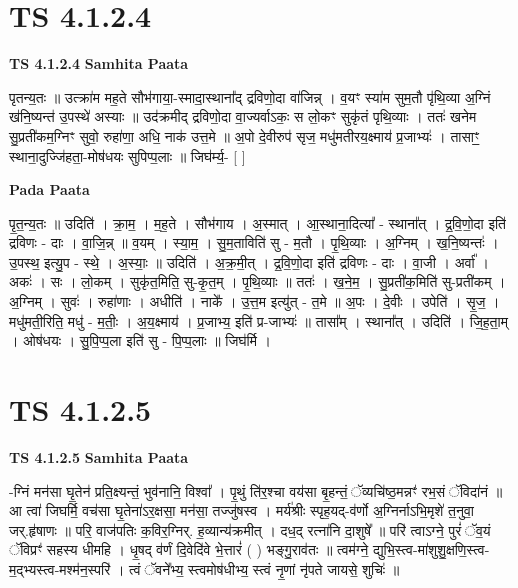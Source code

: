 \documentclass[17pt]{extarticle}
\begin{document}

\section{ TS 4.1.2.4 }

\textbf{TS 4.1.2.4 } \newline
\textbf{Samhita Paata} \newline

पृतन्य॒तः ॥ उत्क्रा॑म मह॒ते सौभ॑गाया॒-स्मादा॒स्थाना᳚द् द्रविणो॒दा वा॑जिन्न् । व॒यꣳ स्या॑म सुम॒तौ पृ॑थि॒व्या अ॒ग्निं ख॑नि॒ष्यन्त॑ उ॒पस्थे॑ अस्याः ॥ उद॑क्रमीद् द्रविणो॒दा वा॒ज्यर्वाऽकः॒ स लो॒कꣳ सुकृ॑तं पृथि॒व्याः । ततः॑ खनेम सु॒प्रती॑कम॒ग्निꣳ सुवो॒ रुहा॑णा॒ अधि॒ नाक॑ उत्त॒मे ॥ अ॒पो दे॒वीरुप॑ सृज॒ मधु॑मतीरय॒क्ष्माय॑ प्र॒जाभ्यः॑ । तासाꣳ॒॒ स्थाना॒दुज्जि॑हता॒-मोष॑धयः सुपिप्प॒लाः ॥ जिघ॑र्म्य॒- [  ] \newline

\textbf{Pada Paata} \newline

पृ॒त॒न्य॒तः ॥ उदिति॑ । क्रा॒म॒ । म॒ह॒ते । सौभ॑गाय । अ॒स्मात् । आ॒स्थाना॒दित्या᳚ - स्थाना᳚त् । द्र॒वि॒णो॒दा इति॑ द्रविणः - दाः । वा॒जि॒न्न् ॥ व॒यम् । स्या॒म॒ । सु॒म॒ताविति॑ सु - म॒तौ । पृ॒थि॒व्याः । अ॒ग्निम् । ख॒नि॒ष्यन्तः॑ । उ॒पस्थ॒ इत्यु॒प - स्थे॒ । अ॒स्याः॒ ॥ उदिति॑ । अ॒क्र॒मी॒त् । द्र॒वि॒णो॒दा इति॑ द्रविणः - दाः । वा॒जी । अर्वा᳚ । अकः॑ । सः । लो॒कम् । सुकृ॑त॒मिति॒ सु-कृ॒त॒म् । पृ॒थि॒व्याः ॥ ततः॑ । ख॒ने॒म॒ । सु॒प्रती॑क॒मिति॑ सु-प्रती॑कम् । अ॒ग्निम् । सुवः॑ । रुहा॑णाः । अधीति॑ । नाके᳚ । उ॒त्त॒म इत्यु॑त् - त॒मे ॥ अ॒पः । दे॒वीः । उपेति॑ । सृ॒ज॒ । मधु॑मती॒रिति॒ मधु॑ - म॒तीः॒ । अ॒य॒क्ष्माय॑ । प्र॒जाभ्य॒ इति॑ प्र-जाभ्यः॑ ॥ तासा᳚म् । स्थाना᳚त् । उदिति॑ । जि॒ह॒ता॒म् । ओष॑धयः । सु॒पि॒प्प॒ला इति॑ सु - पि॒प्प॒लाः ॥ जिघ॑र्मि ।  \newline





\section{ TS 4.1.2.5 }

\textbf{TS 4.1.2.5 } \newline
\textbf{Samhita Paata} \newline

-ग्निं मन॑सा घृ॒तेन॑ प्रति॒क्ष्यन्तं॒ भुव॑नानि॒ विश्वा᳚ । पृ॒थुं ति॑र॒श्चा वय॑सा बृ॒हन्तं॒ ॅव्यचि॑ष्ठ॒मन्नꣳ॑ रभ॒सं ॅविदा॑नं ॥ आ त्वा॑ जिघर्मि॒ वच॑सा घृ॒तेना॑ऽर॒क्षसा॒ मन॑सा॒ तज्जु॑षस्व । मर्य॑श्रीः स्पृह॒यद्-व॑र्णो अ॒ग्निर्नाऽभि॒मृशे॑ त॒नुवा॒ जर्.हृ॑षाणः ॥ परि॒ वाज॑पतिः क॒विर॒ग्निर्. ह॒व्यान्य॑क्रमीत् । दध॒द् रत्ना॑नि दा॒शुषे᳚ ॥ परि॑ त्वाऽग्ने॒ पुरं॑ ॅव॒यं ॅविप्रꣳ॑ सहस्य धीमहि । धृ॒षद् व॑र्णं दि॒वेदि॑वे भे॒त्तारं॑ ( ) भङ्गु॒राव॑तः ॥ त्वम॑ग्ने॒ द्युभि॒स्त्व-मा॑शुशु॒क्षणि॒स्त्व-म॒द्भ्यस्त्व-मश्म॑न॒स्परि॑ । त्वं ॅवने᳚भ्य॒ स्त्वमोष॑धीभ्य॒ स्त्वं नृ॒णां नृ॑पते जायसे॒ शुचिः॑ ॥ \newline
\end{document}
